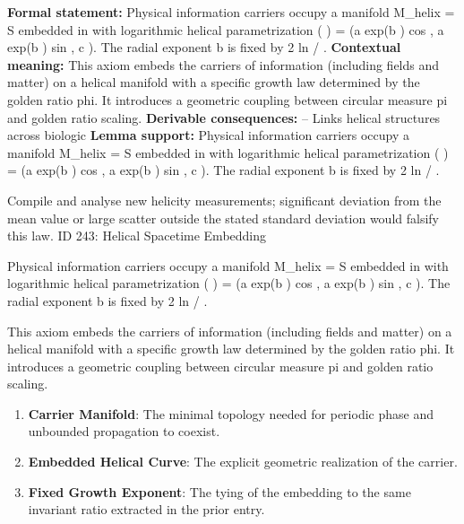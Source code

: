 \begingroup\footnotesize\setlength{\emergencystretch}{3em}\sloppy
\textbf{Formal statement:} Physical information carriers occupy a manifold M\_helix = S      embedded in    with logarithmic helical parametrization  ( ) = (a exp(b  ) cos  , a exp(b  ) sin  , c  ). The radial exponent b is fixed by 2 ln  / .
\textbf{Contextual meaning:} This axiom embeds the carriers of information (including fields and matter) on a helical manifold with a specific growth law determined by the golden ratio phi. It introduces a geometric coupling between circular measure pi and golden ratio scaling.  
\textbf{Derivable consequences:} -- Links helical structures across biologic
\textbf{Lemma support:} Physical information carriers occupy a manifold M\_helix = S      embedded in    with logarithmic helical parametrization  ( ) = (a exp(b  ) cos  , a exp(b  ) sin  , c  ). The radial exponent b is fixed by 2 ln  / .\par
\endgroup

Compile and analyse new helicity measurements; significant deviation from the mean value or large scatter outside the stated standard deviation would falsify this law. ID 243: Helical Spacetime Embedding  

Physical information carriers occupy a manifold M\_helix = S      embedded in    with logarithmic helical parametrization  ( ) = (a exp(b  ) cos  , a exp(b  ) sin  , c  ). The radial exponent b is fixed by 2 ln  / .

This axiom embeds the carriers of information (including fields and matter) on a helical manifold with a specific growth law determined by the golden ratio phi. It introduces a geometric coupling between circular measure pi and golden ratio scaling.  
\endgroup

\begin{enumerate}[leftmargin=1.6em,itemsep=6pt,topsep=4pt]
\item \textbf{Carrier Manifold}: The minimal topology needed for periodic phase and unbounded propagation to coexist.
\item \textbf{Embedded Helical Curve}: The explicit geometric realization of the carrier.
\item \textbf{Fixed Growth Exponent}: The tying of the embedding to the same invariant ratio extracted in the prior entry.
\end{enumerate}

